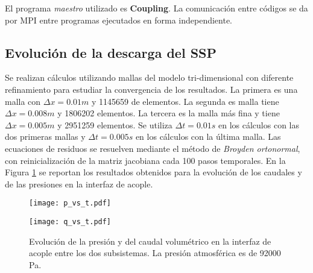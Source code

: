 El programa \textit{maestro} utilizado es \textbf{Coupling}.
La comunicación entre códigos se da por MPI entre programas ejecutados en forma independiente.

\subsection*{Evolución de la descarga del SSP}

Se realizan cálculos utilizando mallas del modelo tri-dimensional con diferente refinamiento para estudiar la convergencia de los resultados.
La primera es una malla con $\Delta x=0.01m$ y 1145659 de elementos. 
La segunda es malla tiene $\Delta x=0.008m$ y 1806202 elementos.
La tercera es la malla más fina y tiene $\Delta x=0.005m$ y 2951259 elementos.
Se utiliza $\Delta t=0.01s$ en los cálculos con las dos primeras mallas y $\Delta t=0.005s$ en los cálculos con la última malla.
Las ecuaciones de residuos se resuelven
mediante el método de \textit{Broyden ortonormal},
con reinicialización de la matriz jacobiana cada 100 pasos temporales.
En la Figura \ref{qpvst} se reportan los resultados obtenidos para la evolución de los caudales y de las presiones en la interfaz de acople.

\begin{figure}[ht]
	\begin{minipage}{0.5\linewidth}
		\centering
		\texttt{[image: p\_vs\_t.pdf]}
		\label{asd}	
	\end{minipage}
	\begin{minipage}{0.5\linewidth}
		\centering
		\texttt{[image: q\_vs\_t.pdf]}
		\label{asd}	
	\end{minipage}
	\caption[Evolución de la presión y del caudal volumétrico en la interfaz de acople]
  {Evolución de la presión y del caudal volumétrico en la interfaz de acople entre los dos subsistemas.
  La presión atmosférica es de 92000 Pa.}  
	\label{qpvst}
\end{figure}


